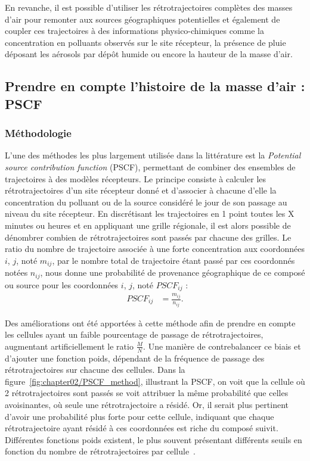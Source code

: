 En revanche, il est possible d'utiliser les rétrotrajectoires complètes des masses d'air
pour remonter aux sources géographiques potentielles et également de coupler ces
trajectoires à des informations physico-chimiques comme la concentration en polluants
observés sur le site récepteur, la présence de pluie déposant les aérosols par dépôt
humide ou encore la hauteur de la masse d'air.

\subsection{Prendre en compte l'histoire de la masse d'air : PSCF}%
\label{sub:prendre_en_compte_l_histoire_de_la_masse_d_air_PSCF}

\subsubsection{Méthodologie}%
\label{ssub:méthodologie}

L'une des méthodes les plus largement utilisée dans la littérature est la \textit{Potential
source contribution function} (PSCF), permettant de combiner des ensembles de trajectoires à
des modèles récepteurs. Le principe consiste à calculer les rétrotrajectoires d'un site
récepteur donné et d'associer à chacune d'elle la concentration du polluant ou de la
source considéré le jour de son passage au niveau du site récepteur. En discrétisant les
trajectoires en 1 point toutes les X minutes ou heures et en appliquant une grille
régionale, il est alors possible de dénombrer combien de rétrotrajectoires sont passés par
chacune des grilles.  Le ratio du nombre de trajectoire associée à une forte concentration
aux coordonnées $i$, $j$, noté $m_{ij}$, par le nombre total de trajectoire étant passé
par ces coordonnés notées $n_{ij}$, nous donne une probabilité de provenance géographique
de ce composé ou source pour les coordonnées $i$, $j$, noté $PSCF_{ij}$ :
\begin{align}
    \label{eq:PSCF}
    PSCF_{ij} &= \frac{m_{ij}}{n_{ij}}.
\end{align}

Des améliorations ont été apportées à cette méthode afin de prendre en compte les cellules
ayant un faible pourcentage de passage de rétrotrajectoires, augmentant artificiellement
le ratio $\frac{M}{N}$. Une manière de contrebalancer ce biais et d'ajouter une fonction
poids, dépendant de la fréquence de passage des rétrotrajectoires sur chacune des
cellules. Dans la figure~\ref{fig:chapter02/PSCF_method}, illustrant la PSCF, on voit que
la cellule où 2 rétrotrajectoires sont passés se voit attribuer la même probabilité que
celles avoisinantes, où seule une rétrotrajectoire a résidé. Or, il serait plus pertinent
d'avoir une probabilité plus forte pour cette cellule, indiquant que chaque
rétrotrajectoire ayant résidé à ces coordonnées est riche du composé suivit.  Différentes
fonctions poids existent, le plus souvent présentant différents seuils en fonction du
nombre de rétrotrajectoires par cellule~\autocite{bressiSources2014,petitSources2019}.

